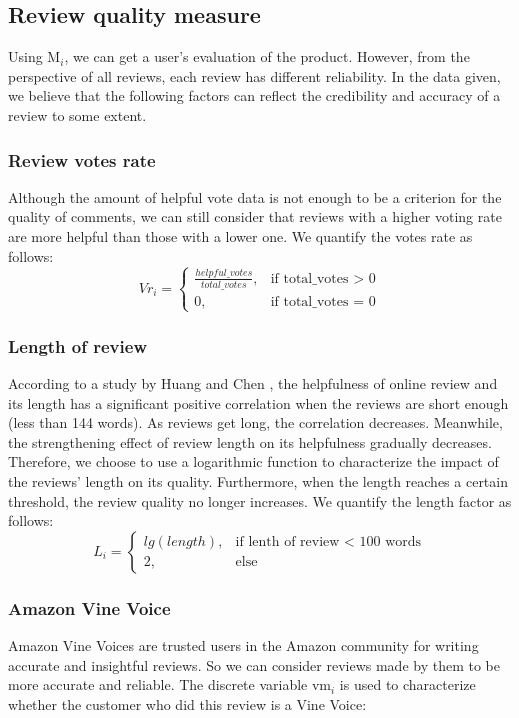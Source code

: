 \documentclass{mcmthesis}
\begin{document}
\subsection{ Review quality measure}
Using M$_{i}$, we can get a user's evaluation of the product. However, from the perspective of all reviews, each review has different reliability. In the data given, we believe that the following factors can reflect the credibility and accuracy of a review to some extent.

\subsubsection{ Review votes rate}
Although the amount of helpful vote data is not enough to be a criterion for the quality of comments, we can still consider that reviews with a higher voting rate are more helpful than those with a lower one. We quantify the votes rate as follows:
\[
Vr_{i} = \begin{cases}  
\frac{helpful\_votes}{total\_votes}, & \text{if total\_votes > 0} \\
0, & \text{if total\_votes = 0}
\end{cases}
\]

\subsubsection{ Length of review}
According to a study by Huang and Chen \cite{1}, the helpfulness of online review and its length has a significant positive correlation when the reviews are short enough (less than 144 words). As reviews get long, the correlation decreases. Meanwhile, the strengthening effect of review length on its helpfulness gradually decreases. Therefore, we choose to use a logarithmic function to characterize the impact of the reviews' length on its quality. Furthermore, when the length reaches a certain threshold, the review quality no longer increases. We quantify the length factor as follows:
\[
L_{i} =
\begin{cases}  
	 lg (length), &\text{if lenth of review < 100 words} \\
	2, &\text{else}
\end{cases}
\]

\subsubsection{Amazon Vine Voice}
Amazon Vine Voices are trusted users in the Amazon community for writing accurate and insightful reviews. So we can consider reviews made by them to be more accurate and reliable. The discrete variable vm$_{i}$ is used to characterize whether the customer who did this review is a Vine Voice:
\end{document}
